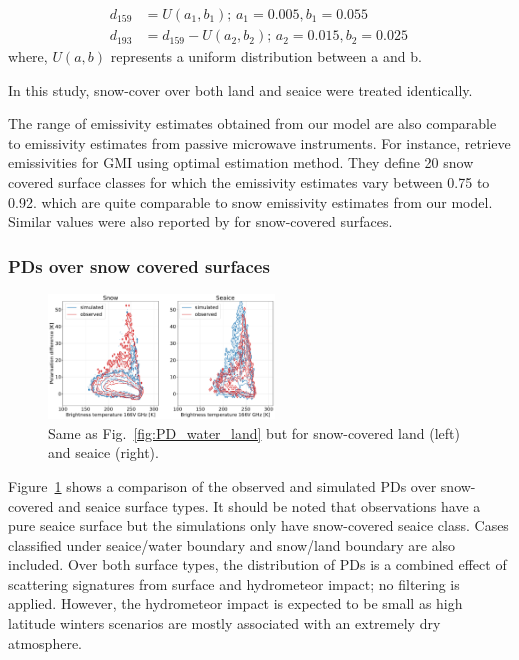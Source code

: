 \documentclass[amt, manuscript]{copernicus}
\begin{document}
\begin{align}
d_{159}& = U(a_1, b_1) ;\, a_1 = 0.005, b_1 = 0.055\\
d_{193}& = d_{159} - U(a_2, b_2) ;\, a_2 = 0.015, b_2 = 0.025 \,
\end{align}
where, $U(a, b)$ represents a uniform distribution between a and b. 

In this study, snow-cover over both land and seaice were treated identically.
  
The range of emissivity estimates obtained from our model are also comparable to emissivity estimates from passive microwave instruments. For instance, \citet{munchak2020active} retrieve emissivities for GMI using optimal estimation method. They define 20 snow covered surface classes for which the emissivity estimates vary between 0.75 to 0.92.   which are quite comparable to snow emissivity estimates from our model. Similar values were also reported by \citet{camplani2021passive} for snow-covered surfaces.
 

\subsubsection{PDs over snow covered surfaces}
%
\begin{figure}[t]
	\includegraphics[width=6cm]{Figures/hist2d_snow_surface_jan.pdf}
	\caption{Same as Fig.~\ref{fig:PD_water_land} but for snow-covered land (left) and seaice (right).}
	\label{fig:PD_snow}
\end{figure}

Figure~\ref{fig:PD_snow} shows a comparison of the observed and simulated PDs over snow-covered and seaice surface types. It should be noted that observations have a pure seaice surface but the simulations only have snow-covered seaice class. Cases classified under seaice/water boundary and snow/land boundary are also included. Over both surface types, the distribution of PDs is a combined effect of scattering signatures from surface and hydrometeor impact; no filtering is applied. However, the hydrometeor impact is expected to be small as high latitude winters scenarios are mostly associated with an extremely dry atmosphere. 
  
\end{document}

